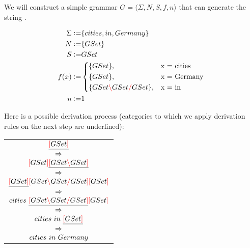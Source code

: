 \documentclass[main.tex]{subfiles}
\begin{document}
\begin{example}
    \label{ex:deriv}

    We will construct a simple grammar $G = \langle \Sigma, N, S, f, n \rangle$
    that can generate the string .

    \begin{align*}
        \Sigma \defeq& \{ cities, in, Germany \} \\
        N \defeq& \{ GSet \} \\
        S \defeq& GSet \\
        f(x) \defeq&
            \begin{cases*}
                \{ GSet \},& x = cities \\
                \{ GSet \},& x = Germany \\
                \{ GSet \lc GSet \rc GSet \},& x = in \\
            \end{cases*} \\
        n \defeq& 1 \\
    \end{align*}

    Here is a possible derivation process (categories to which we apply
    derivation rules on the next step are underlined):
    \begin{center}
        \begin{tabular}{c}
            $\underline{\textcolor{red}{[} GSet \textcolor{red}{]}}$ \\ $\Rightarrow$ \\
            $\textcolor{red}{[} GSet \textcolor{red}{]} \underline{\textcolor{red}{[} GSet \textcolor{red}{\backslash} GSet \textcolor{red}{]}}$ \\ $\Rightarrow$ \\
            $\underline{\textcolor{red}{[} GSet \textcolor{red}{]}} \textcolor{red}{[} GSet \textcolor{red}{\backslash} GSet \textcolor{red}{/} GSet \textcolor{red}{]} \textcolor{red}{[} GSet \textcolor{red}{]}$ \\ $\Rightarrow$ \\
            $cities \text{ } \underline{\textcolor{red}{[} GSet \textcolor{red}{\backslash} GSet \textcolor{red}{/} GSet \textcolor{red}{]}} \textcolor{red}{[} GSet \textcolor{red}{]}$ \\ $\Rightarrow$ \\
            $cities \text{ } in \text{ } \underline{\textcolor{red}{[} GSet \textcolor{red}{]}}$ \\ $\Rightarrow$ \\
            $cities \text{ } in \text{ } Germany$ \\
        \end{tabular}
    \end{center}
\end{example}
\end{document}
